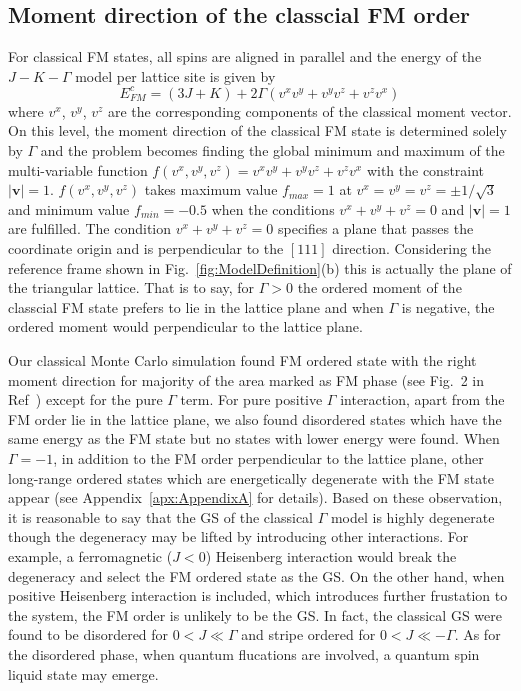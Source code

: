 \documentclass[aps,prb,reprint,amsfonts,amsmath,amssymb,showpacs,groupedaddress,superscriptaddress]{revtex4-1}
\begin{document}
\subsection{\label{sec:SectionIIIA}Moment direction of the classcial FM order}
For classical FM states, all spins are aligned in parallel and the energy of the $J-K-\Gamma$ model per lattice site is given by
\begin{equation}
    E_{FM}^{c} = (3J + K) + 2 \Gamma (v^x v^y + v^y v^z + v^z v^x) \label{eq:EcFM}
\end{equation}
where $v^x$, $v^y$, $v^z$ are the corresponding components of the classical moment vector. On this level, the moment direction of the classical FM state is determined solely by $\Gamma$ and the problem becomes finding the global minimum and maximum of the multi-variable function $f(v^x, v^y, v^z) = v^x v^y + v^y v^z + v^z v^x$ with the constraint $|\bm{v}| = 1$. $f(v^x, v^y, v^z)$ takes maximum value $f_{max}=1$ at $v^x=v^y=v^z=\pm 1/\sqrt{3}$ and minimum value $f_{min}=-0.5$ when the conditions $v^x + v^y + v^z = 0$ and $|\bm{v}| = 1$ are fulfilled. The condition $v^x + v^y + v^z = 0$ specifies a plane that passes the coordinate origin and is perpendicular to the $[111]$ direction. Considering the reference frame shown in Fig.~\ref{fig:ModelDefinition}(b) this is actually the plane of the triangular lattice. That is to say, for $\Gamma > 0$ the ordered moment of the classcial FM state prefers to lie in the lattice plane and when $\Gamma$ is negative, the ordered moment would perpendicular to the lattice plane.

Our classical Monte Carlo simulation found FM ordered state with the right moment direction for majority of the area marked as FM phase (see Fig.~2 in Ref~) except for the pure $\Gamma$ term. For pure positive $\Gamma$ interaction, apart from the FM order lie in the lattice plane, we also found disordered states which have the same energy as the FM state but no states with lower energy were found. When $\Gamma=-1$, in addition to the FM order perpendicular to the lattice plane, other long-range ordered states which are energetically degenerate with the FM state appear (see Appendix~\ref{apx:AppendixA} for details). Based on these observation, it is reasonable to say that the GS of the classical $\Gamma$ model is highly degenerate though the degeneracy may be lifted by introducing other interactions. For example, a ferromagnetic ($J<0$) Heisenberg interaction would break the degeneracy and select the FM ordered state as the GS. On the other hand, when positive Heisenberg interaction is included, which introduces further frustation to the system, the FM order is unlikely to be the GS. In fact, the classical GS were found to be disordered for $0 < J \ll \Gamma$ and stripe ordered for $0 < J \ll -\Gamma$. As for the disordered phase, when quantum flucations are involved, a quantum spin liquid state may emerge.
\end{document}
